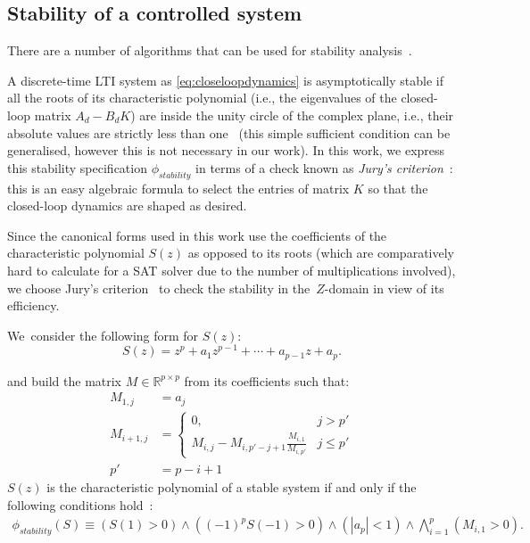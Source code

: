 \documentclass[sigconf]{llncs}
\newcommand{\mat}[1]{{#1}}
\begin{document}
\subsection{Stability of a controlled system} 
\label{sec:closed_stability}
There are a number of algorithms that can be
used for stability analysis~\cite{daes20161,Bessa16}.

A discrete-time LTI system as \eqref{eq:closeloopdynamics} is
asymptotically stable if all the roots of its characteristic
polynomial (i.e., the eigenvalues of the closed-loop matrix $A_d - B_d
K$) are inside the unity circle of the complex plane, i.e., their
absolute values are strictly less than one~\cite{astrom1997computer}
(this simple sufficient condition can be generalised, however this is
not necessary in our work).  In this work, we express this stability
specification $\phi_\mathit{stability}$ in terms of a check known as
\emph{Jury's criterion}~\cite{fadali}: this is an easy algebraic
formula to select the entries of matrix $K$ so that the closed-loop
dynamics are shaped as desired.

Since the canonical forms used in this work use the coefficients of the
characteristic polynomial $S(z)$ as opposed to its roots (which are
comparatively hard to calculate for a SAT solver due to the number of
multiplications involved), we choose Jury's criterion~\cite{astrom1997computer}
to check the stability in the~$Z$-domain in view of its efficiency.

We~consider the following form for $S(z)$:
%
\begin{equation*}
S(z) = z^{p}+a_1z^{p-1}+\cdots+a_{p-1}z+a_p.
\end{equation*}

and build the matrix
$\mat{M} \in \mathbb{R}^{p \times p}$ from its coefficients such that:
%
\begin{align*}
\mat{M}_{1,j}&=a_j\\
\mat{M}_{i+1,j}&=\left\{
\begin{array}{ll}
0,&j>p'\\
\mat{M}_{i,j}-\mat{M}_{i,p'-j+1}\frac{\mat{M}_{i,1}}{\mat{M}_{i,p'}} &j\leq p'
\end{array}
\right.\\
p'&=p-i+1
\end{align*}
%
$S(z)$ is the characteristic polynomial of a stable system if and
only if the following conditions hold~\cite{astrom1997computer}:
\begin{align*}
\phi_\mathit{stability}(S) \equiv
(S(1) > 0) \wedge ((-1)^p S(-1) > 0) \wedge (|a_p| < 1) \wedge \bigwedge\limits_{i=1}^p (\mat{M}_{i,1} > 0).
\end{align*}
\end{document}
